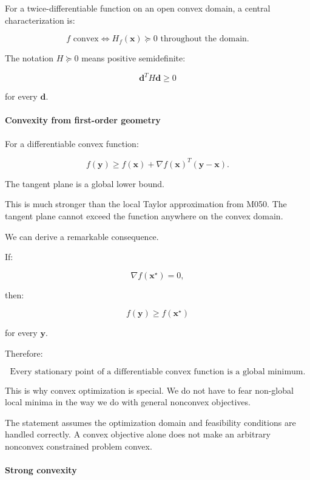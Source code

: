 For a twice-differentiable function on an open convex domain, a central characterization is:

\[
\boxed{ f\text{ convex} \iff H_f(\mathbf x)\succeq0 \text{ throughout the domain} }.
\]

The notation \(H\succeq0\) means positive semidefinite:

\[
\mathbf d^TH\mathbf d\ge0
\]

for every \(\mathbf d\).

\paragraph{Convexity from first-order geometry}\label{02-foundations-ii-ch026-convexity-from-first-order-geometry}

\hypertarget{02-foundations-ii-ch026-convexity-from-first-order-geometry}{}

For a differentiable convex function:

\[
\boxed{ f(\mathbf y)\ge f(\mathbf x)+ \nabla f(\mathbf x)^T(\mathbf y-\mathbf x) }.
\]

The tangent plane is a global lower bound.

This is much stronger than the local Taylor approximation from M050. The tangent plane cannot exceed the function anywhere on the convex domain.

We can derive a remarkable consequence.

If:

\[
\nabla f(\mathbf x^\star)=0,
\]

then:

\[
f(\mathbf y)\ge f(\mathbf x^\star)
\]

for every \(\mathbf y\).

Therefore:

\[
\boxed{ \text{Every stationary point of a differentiable convex function is a global minimum.} }
\]

This is why convex optimization is special. We do not have to fear non-global local minima in the way we do with general nonconvex objectives.

The statement assumes the optimization domain and feasibility conditions are handled correctly. A convex objective alone does not make an arbitrary nonconvex constrained problem convex.

\paragraph{Strong convexity}\label{02-foundations-ii-ch026-strong-convexity}

